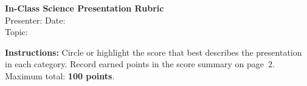 \documentclass[10pt, letterpaper]{article}
\begin{document}
\begin{center}
  {\large\bfseries\color{headerblue} In-Class Science Presentation Rubric}\\[4pt]
  {\small Presenter: \underline{\hspace{10cm}} \;
   Date: \underline{\hspace{2.5cm}}}\\[2pt]
  {\small Topic: \underline{\hspace{12.8cm}}}
\end{center}

\vspace{3pt}
{\small\textbf{Instructions:} Circle or highlight the score that best describes the presentation in each category.
Record earned points in the score summary on page~2. Maximum total: \textbf{100 points}.}

\vspace{6pt}

\renewcommand{\arraystretch}{1.35}
\setlength{\tabcolsep}{4pt}
\footnotesize
\end{document}
